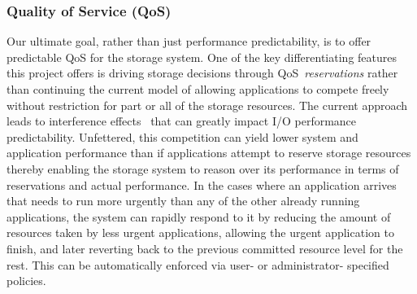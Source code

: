 \subsubsection{Quality of Service (QoS)}
Our ultimate goal, rather than just performance predictability, is to offer
predictable QoS for the storage system.
One of the key differentiating features this project offers is driving storage
decisions through QoS~\emph{reservations} rather than continuing the current
model of allowing applications to compete freely without restriction for part
or all of the storage resources. The current approach leads to interference
effects~\cite{lofstead:2010:io-variability,liu_hotstorage} that can greatly
impact I/O performance predictability. 
Unfettered, this competition can yield lower system and application performance
than if applications attempt to reserve storage resources thereby enabling the
storage system to reason over its performance in terms of reservations and
actual performance.  In the cases where an application arrives that needs to
run more urgently than any of the other already running applications, the
system can rapidly respond to it by reducing the amount of resources taken by
less urgent applications, allowing the urgent application to finish, and later
reverting back to the previous committed resource level for the rest.  This can
be automatically enforced via user- or administrator- specified
policies.

